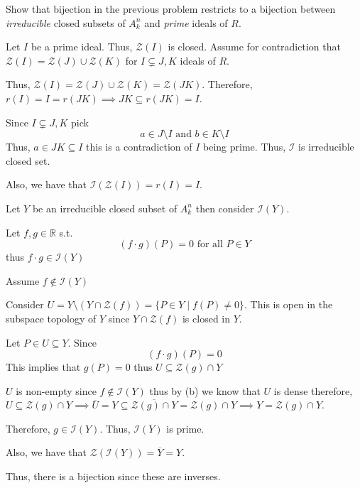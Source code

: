 \documentclass[12pt, letterpaper]{article}
\newcommand{\R}{\mathbb{R}}
\renewcommand{\t}[1]{\text{#1}}
\begin{document}
\qh
\addtocounter{subproblemcounter}{3}
\begin{subproblem}{}
    Show that bijection in the previous problem restricts to a bijection between {\it irreducible} closed subsets of $A^n_k$ and {\it prime} ideals of $R$. 
\end{subproblem}
\begin{problemproof}{}
    Let $I$ be a prime ideal. Thus, $\mathcal{Z}(I)$ is closed. Assume for contradiction that $\mathcal{Z}(I)=\mathcal{Z}(J) \cup \mathcal{Z}(K)$ for $I \subsetneq J,K$ ideals of $R$.

    Thus, $\mathcal{Z}(I)=\mathcal{Z}(J) \cup \mathcal{Z}(K)=\mathcal{Z}(JK)$. Therefore, $r(I)=I=r(JK) \implies JK \subseteq r(JK)=I$.

    Since $I \subsetneq J,K$ pick
    \[ a\in J \setminus I \t{ and } b \in K \setminus I\]
    Thus, $a \in JK \subseteq I$ this is a contradiction of $I$ being prime. Thus, $\mathcal{I}$ is irreducible closed set.
    
    Also, we have that $\mathcal{I}(\mathcal{Z}(I))=r(I)=I$.

    Let $Y$ be an irreducible closed subset of $A_k^n$ then consider $\mathcal{I}(Y)$.

    Let $f,g \in \R$ s.t.
    \[(f \cdot g)(P)=0 \t{ for all } P \in Y\]
    thus $f \cdot g \in \mathcal{I}(Y)$

    Assume $f \notin \mathcal{I}(Y)$

    Consider $U=Y \setminus (Y \cap \mathcal{Z}(f))=\{P \in Y \mid f(P) \neq 0\}$. This is open in the subspace topology of $Y$ since $Y \cap \mathcal{Z}(f)$ is closed in $Y$.

    Let $P \in U \subseteq Y$. Since
    \[(f \cdot g)(P)=0\]
    This implies that $g(P)=0$ thus $U \subseteq \mathcal{Z}(g) \cap Y$
    
    $U$ is non-empty since $f \notin \mathcal{I}(Y)$ thus by (b) we know that $U$ is dense therefore, $U \subseteq \mathcal{Z}(g) \cap Y \implies \overline{U}=Y \subseteq \overline{\mathcal{Z}(g) \cap Y}=\mathcal{Z}(g) \cap Y \implies Y=\mathcal{Z}(g) \cap Y$.

    Therefore, $g \in \mathcal{I}(Y)$. Thus, $\mathcal{I}(Y)$ is prime.
    
    Also, we have that $\mathcal{Z}(\mathcal{I}(Y))=\overline{Y}=Y$.

    Thus, there is a bijection since these are inverses.
\end{problemproof}
\end{document}
